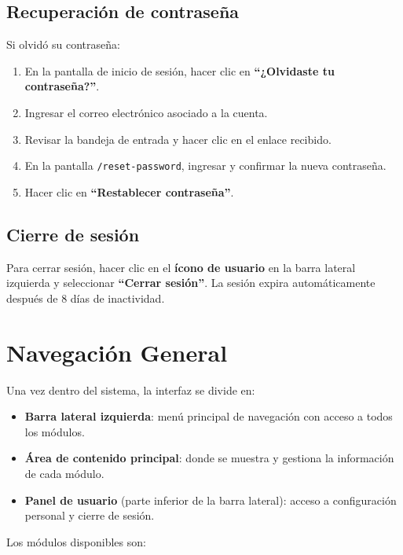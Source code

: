 \subsection{Recuperación de contraseña}\label{recuperaciuxf3n-de-contraseuxf1a}

Si olvidó su contraseña:

\begin{enumerate}
\def\labelenumi{\arabic{enumi}.}
\tightlist
\item
  En la pantalla de inicio de sesión, hacer clic en \textbf{``¿Olvidaste tu contraseña?''}.
\item
  Ingresar el correo electrónico asociado a la cuenta.
\item
  Revisar la bandeja de entrada y hacer clic en el enlace recibido.
\item
  En la pantalla \texttt{/reset-password}, ingresar y confirmar la nueva contraseña.
\item
  Hacer clic en \textbf{``Restablecer contraseña''}.
\end{enumerate}

\subsection{Cierre de sesión}\label{cierre-de-sesiuxf3n}

Para cerrar sesión, hacer clic en el \textbf{ícono de usuario} en la barra lateral izquierda y seleccionar \textbf{``Cerrar sesión''}. La sesión expira automáticamente después de 8 días de inactividad.

\section{Navegación General}\label{navegaciuxf3n-general}

Una vez dentro del sistema, la interfaz se divide en:

\begin{itemize}
\tightlist
\item
  \textbf{Barra lateral izquierda}: menú principal de navegación con acceso a todos los módulos.
\item
  \textbf{Área de contenido principal}: donde se muestra y gestiona la información de cada módulo.
\item
  \textbf{Panel de usuario} (parte inferior de la barra lateral): acceso a configuración personal y cierre de sesión.
\end{itemize}

Los módulos disponibles son:

